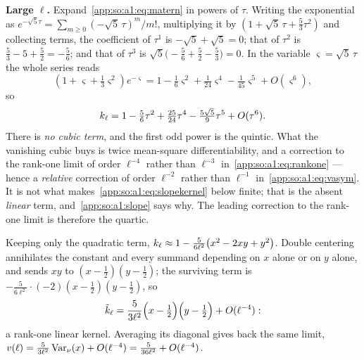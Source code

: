 \textbf{Large $\ell$.} Expand~\eqref{app:so:a1:eq:matern} in powers of $\tau$.
Writing the exponential as
$e^{-\sqrt5\tau}=\sum_{m\ge0}{(-\sqrt5\,\tau)}^m/{m!}$, multiplying it by
$(1+\sqrt5\,\tau+\tfrac53\tau^2)$ and collecting terms, the coefficient of
$\tau^1$ is $-\sqrt5+\sqrt5=0$; that of $\tau^2$ is
$\tfrac53-5+\tfrac52=-\tfrac56$; and that of $\tau^3$ is
$\sqrt5\bigl(-\tfrac56+\tfrac52-\tfrac53\bigr)=0$. In the variable
$\varsigma=\sqrt5\,\tau$ the whole series reads
\[
  (1+\varsigma+\tfrac13\varsigma^2)e^{-\varsigma}
  =1-\tfrac16\varsigma^2+\tfrac1{24}\varsigma^4-\tfrac1{45}\varsigma^5
   +O(\varsigma^6),
\]
so
\begin{equation}\label{app:so:a1:eq:expansion}
  k_\ell=1-\tfrac56\tau^2+\tfrac{25}{24}\tau^4-\tfrac{5\sqrt5}{9}\tau^5
       +O(\tau^6).
\end{equation}
There is \emph{no cubic term}, and the first odd power is the quintic. What
the vanishing cubic buys is twice mean-square differentiability, and a
correction to the rank-one limit of order $\ell^{-4}$ rather than $\ell^{-3}$
in~\eqref{app:so:a1:eq:rankone} --- hence a \emph{relative} correction of
order $\ell^{-2}$ rather than $\ell^{-1}$ in~\eqref{app:so:a1:eq:vasym}. It is
not what makes~\eqref{app:so:a1:eq:slopekernel} below finite; that is the
absent \emph{linear} term, and~\ref{app:so:a1:slope} says why. The leading
correction to the rank-one limit is therefore the quartic.

Keeping only the quadratic term,
$k_\ell\approx1-\tfrac{5}{6\ell^2}\bigl(x^2-2xy+y^2\bigr)$. Double centering
annihilates the constant and every summand depending on $x$ alone or on $y$
alone, and sends $xy$ to $(x-\tfrac12)(y-\tfrac12)$; the surviving term is
$-\tfrac{5}{6\ell^2}\cdot(-2)(x-\tfrac12)(y-\tfrac12)$, so
\begin{equation}\label{app:so:a1:eq:rankone}
  \tilde k_\ell=\frac{5}{3\ell^2}\Bigl(x-\tfrac12\Bigr)\Bigl(y-\tfrac12\Bigr)
        +O(\ell^{-4}) :
\end{equation}
a rank-one linear kernel. Averaging its diagonal gives back the same limit,
$v(\ell)=\tfrac{5}{3\ell^2}\operatorname{\mathrm{Var}}_\nu(x)+O(\ell^{-4})
=\tfrac{5}{36\ell^2}+O(\ell^{-4})$.

